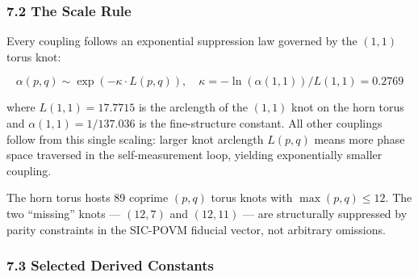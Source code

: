 \hypertarget{the-scale-rule}{%
\subsubsection{7.2 The Scale Rule}\label{the-scale-rule}}

Every coupling follows an exponential suppression law governed by the
\((1,1)\) torus knot:

\[\alpha(p,q) \sim \exp(-\kappa \cdot L(p,q)), \quad \kappa = -\ln(\alpha(1,1)) / L(1,1) = 0.2769\]

where \(L(1,1) = 17.7715\) is the arclength of the \((1,1)\) knot on the
horn torus and \(\alpha(1,1) = 1/137.036\) is the fine-structure
constant. All other couplings follow from this single scaling: larger
knot arclength \(L(p,q)\) means more phase space traversed in the
self-measurement loop, yielding exponentially smaller coupling.

The horn torus hosts 89 coprime \((p,q)\) torus knots with
\(\max(p,q) \leq 12\). The two ``missing'' knots --- \((12,7)\) and
\((12,11)\) --- are structurally suppressed by parity constraints in the
SIC-POVM fiducial vector, not arbitrary omissions.

\hypertarget{selected-derived-constants}{%
\subsubsection{7.3 Selected Derived
Constants}\label{selected-derived-constants}}

